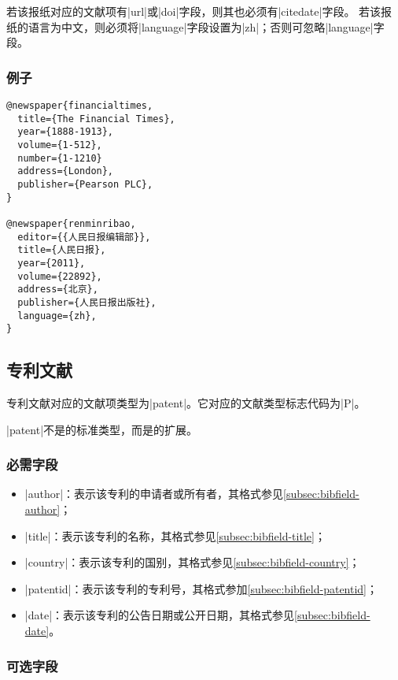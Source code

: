 \begin{note}
若该报纸对应的文献项有|url|或|doi|字段，则其也必须有|citedate|字段。
若该报纸的语言为中文，则必须将|language|字段设置为|zh|；否则可忽略|language|字段。
\end{note}

\subsubsection{例子}

\begin{verbatim}
@newspaper{financialtimes,
  title={The Financial Times},
  year={1888-1913},
  volume={1-512},
  number={1-1210}
  address={London},
  publisher={Pearson PLC},  
}

@newspaper{renminribao,
  editor={{人民日报编辑部}},
  title={人民日报},
  year={2011},
  volume={22892},
  address={北京},
  publisher={人民日报出版社},
  language={zh},
}
\end{verbatim}


\subsection{专利文献}\label{subsec:bibtype-patent}

专利文献对应的{\BibTeX}文献项类型为|patent|。它对应的文献类型标志代码为|P|\cite{gbt3469-1983}。

|patent|不是{\BibTeX}的标准类型，而是{\njuthesis}的扩展。

\subsubsection{必需字段}

\begin{itemize}
\item |author|：表示该专利的申请者或所有者，其格式参见\ref{subsec:bibfield-author}；
\item |title|：表示该专利的名称，其格式参见\ref{subsec:bibfield-title}；
\item |country|：表示该专利的国别，其格式参见\ref{subsec:bibfield-country}；
\item |patentid|：表示该专利的专利号，其格式参加\ref{subsec:bibfield-patentid}；
\item |date|：表示该专利的公告日期或公开日期，其格式参见\ref{subsec:bibfield-date}。
\end{itemize}

\subsubsection{可选字段}

